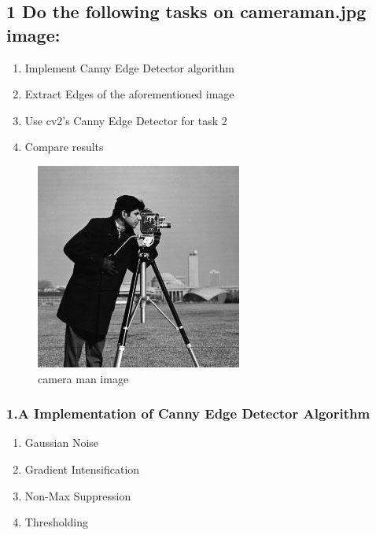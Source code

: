 \documentclass[11pt]{article}
\makeatletter
\def\maxwidth{\ifdim\Gin@nat@width>\linewidth\linewidth
    \else\Gin@nat@width\fi}
\let\Oldincludegraphics\includegraphics
\renewcommand{\includegraphics}[1]{\Oldincludegraphics[width=.8\maxwidth]{#1}}
\providecommand{\tightlist}{%
      \setlength{\itemsep}{0pt}\setlength{\parskip}{0pt}}
\makeatother
\begin{document}
    \hypertarget{do-the-following-tasks-on-cameraman.jpg-image}{%
\subsection{1 Do the following tasks on cameraman.jpg
image:}\label{do-the-following-tasks-on-cameraman.jpg-image}}

\begin{enumerate}
\def\labelenumi{\arabic{enumi}.}
\tightlist
\item
  Implement Canny Edge Detector algorithm
\item
  Extract Edges of the aforementioned image
\item
  Use cv2's Canny Edge Detector for task 2
\item
  Compare results
\end{enumerate}

\begin{figure}
\centering
\includegraphics{images/cameraman.jpg}
\caption{camera man image}
\end{figure}

    \hypertarget{a-implementation-of-canny-edge-detector-algorithm}{%
\subsubsection{1.A Implementation of Canny Edge Detector
Algorithm}\label{a-implementation-of-canny-edge-detector-algorithm}}

\begin{enumerate}
\def\labelenumi{\arabic{enumi}.}
\tightlist
\item
  Gaussian Noise
\item
  Gradient Intensification
\item
  Non-Max Suppression
\item
  Thresholding
\end{enumerate}
\end{document}
